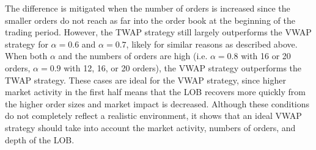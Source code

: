The difference is mitigated when the number of orders is increased since the smaller orders do not reach as far into the order book at the beginning of the trading period. However, the TWAP strategy still largely outperforms the VWAP strategy for $\alpha = 0.6$ and $\alpha = 0.7$, likely for similar reasons as described above. When both $\alpha$ and the numbers of orders are high (i.e. $\alpha = 0.8$ with 16 or 20 orders, $\alpha = 0.9$ with 12, 16, or 20 orders), the VWAP strategy outperforms the TWAP strategy. These cases are ideal for the VWAP strategy, since higher market activity in the first half means that the LOB recovers more quickly from the higher order sizes and market impact is decreased. Although these conditions do not completely reflect a realistic environment, it shows that an ideal VWAP strategy should take into account the market activity, numbers of orders, and depth of the LOB.

